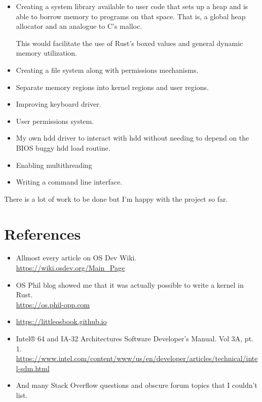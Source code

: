 \documentclass[12pt]{article}
\begin{document}
\begin{itemize}
	\item Creating a system library available to user code that sets up
		a heap and is able to borrow memory to programs on that space. That is,
		a global heap allocator and an analogue to C's malloc.

		This would facilitate the use of Rust's boxed values and general dynamic
		memory utilization.
	\item
		Creating a file system along with permissions mechanisms.
	\item
		Separate memory regions into kernel regions and user regions.
	\item 
		Improving keyboard driver.
	\item
		User permissions system.
	\item
		My own hdd driver to interact with hdd without needing to depend on the
		BIOS buggy hdd load routine.
	\item
		Enabling multithreading
	\item
		Writing a command line interface.
\end{itemize}

There is a lot of work to be done but I'm happy with the project so far.


\section*{References}

\begin{itemize}
	\item Allmost every article on OS Dev Wiki. \\ 
		\url{https://wiki.osdev.org/Main\_Page}
	\item OS Phil blog showed me that it was actually possible to write a kernel in Rust. \\
		\url{https://os.phil-opp.com}
	\item \url{https://littleosbook.github.io}
	\item Intel® 64 and IA-32 Architectures Software Developer’s Manual. Vol 3A, pt. 1. \\
		\url{https://www.intel.com/content/www/us/en/developer/articles/technical/intel-sdm.html}
	\item And many Stack Overflow questions and obscure forum topics that I couldn't list.
\end{itemize}
\end{document}
